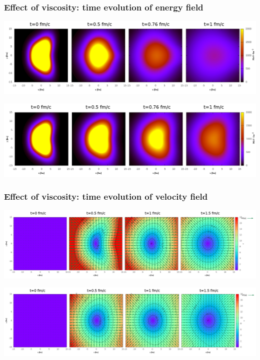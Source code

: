 \documentclass{beamer}
\begin{document}
\begin{frame}
\frametitle{Effect of viscosity: time evolution of energy field}
\begin{minipage}{0.04\textwidth}
\end{minipage}
\begin{minipage}{0.95\textwidth}
\begin{center}
    \includegraphics[scale=0.19]{pic/res/nonrel/anim/ev0}

    \includegraphics[scale=0.19]{pic/res/nonrel/anim/ev10}
\end{center}
\end{minipage}
\end{frame}
\begin{frame}
\frametitle{Effect of viscosity: time evolution of velocity field}
\begin{minipage}{0.04\textwidth}
\end{minipage}
\begin{minipage}{0.95\textwidth}
\begin{center}
    \includegraphics[scale=0.15]{pic/res/nonrel/anim/vv0}

    \includegraphics[scale=0.15]{pic/res/nonrel/anim/vv10}
\end{center}
\end{minipage}
\end{frame}
\end{document}
